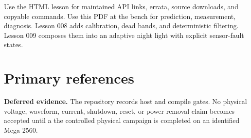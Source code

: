 \documentclass[11pt]{article}
\begin{document}
Use the HTML lesson for maintained API links, errata, source downloads, and
copyable commands. Use this PDF at the bench for prediction, measurement,
diagnosis. Lesson 008 adds calibration,
dead bands, and deterministic filtering. Lesson 009 composes them into an
adaptive night light with explicit sensor-fault states.

\section*{Primary references}


\textbf{Deferred evidence.}
The repository records host and compile gates. No physical voltage, waveform,
current, shutdown, reset, or power-removal claim becomes accepted until a
the controlled physical campaign is completed on an identified Mega 2560.
\end{document}
